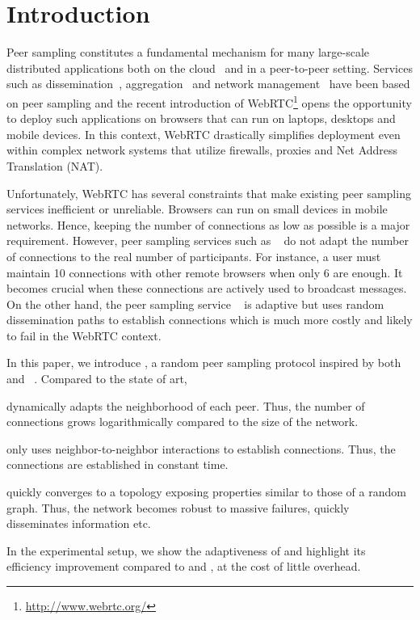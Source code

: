 
\section{Introduction}

Peer sampling constitutes a fundamental mechanism for many large-scale
distributed applications both on the
cloud~\cite{decandia2007dynamo} and in a peer-to-peer
setting. Services such as dissemination~\cite{eugster2003lightweight,
  tolgyeski2009adaptive}, aggregation~\cite{jelasity2004epidemic} and
network management~\cite{jelasity2009tman, voulgaris2005epidemic} have
been based on peer sampling and the recent introduction of
WebRTC\footnote{\url{http://www.webrtc.org/}} opens the opportunity to
deploy such applications on browsers that can run on laptops, desktops
and mobile devices. In this context, WebRTC drastically simplifies
deployment even within complex network systems that utilize firewalls,
proxies and Net Address Translation (NAT).

Unfortunately, WebRTC has several constraints that make existing peer sampling
services inefficient or unreliable. Brow\-sers can run on small devices in
mobile networks. Hence, keeping the number of connections as low as possible is
a major requirement. However, peer sampling services such as
\CYCLON~\cite{voulgaris2005cyclon} do not adapt the number of connections to the
real number of participants. For instance, a user must maintain 10 connections
with other remote browsers when only 6 are enough. It becomes crucial when these
connections are actively used to broadcast messages. On the other hand, the peer
sampling service \SCAMP~\cite{ganesh2003peer} is adaptive but uses random
dissemination paths to establish connections which is much more costly and
likely to fail in the WebRTC context.

In this paper, we introduce \SPRAY, a random peer sampling protocol inspired by
both \SCAMP~\cite{ganesh2003peer}
and \CYCLON~\cite{voulgaris2005cyclon}. Compared to the state of art,
\begin{inparaenum}[(i)]
\item \SPRAY dynamically adapts the neighborhood of each peer. Thus, the number
  of connections grows logarithmically compared to the size of the network.
\item \SPRAY only uses neighbor-to-neighbor interactions to establish
  connections. Thus, the connections are established in constant time.
\item \SPRAY quickly converges to a topology exposing properties similar to
  those of a random graph. Thus, the network becomes robust to massive
  failures, quickly disseminates information etc.
\item In the experimental setup, we show the adaptiveness of \SPRAY and
  highlight its efficiency improvement compared to \CYCLON and \SCAMP, at the
  cost of little overhead.
\end{inparaenum}

